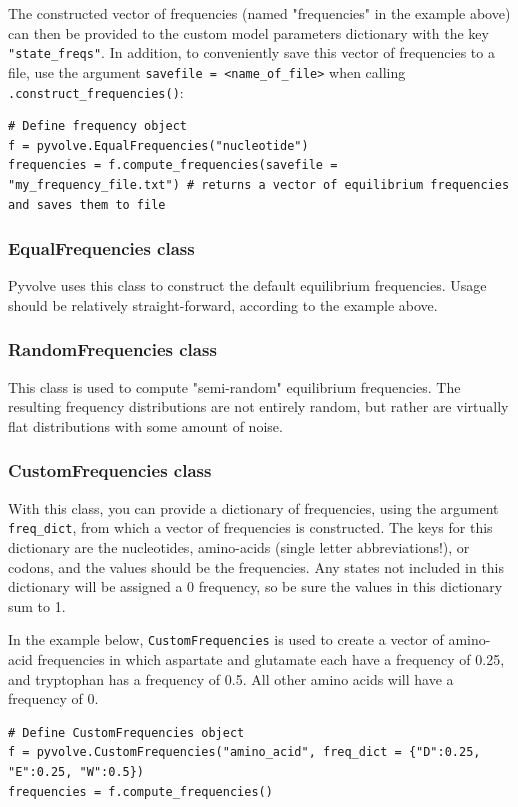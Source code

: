 \documentclass{article}
\newcommand{\code}[1]{\texttt{\small{#1}}}
\begin{document}
The constructed vector of frequencies (named "frequencies" in the example above) can then be provided to the custom model parameters dictionary with the key \code{"state\_freqs"}. In addition, to conveniently save this vector of frequencies to a file, use the argument \code{savefile = <name\_of\_file>} when calling \code{.construct\_frequencies()}:
\begin{lstlisting}
# Define frequency object
f = pyvolve.EqualFrequencies("nucleotide")
frequencies = f.compute_frequencies(savefile = "my_frequency_file.txt") # returns a vector of equilibrium frequencies and saves them to file
\end{lstlisting}


\subsubsection{EqualFrequencies class}
Pyvolve uses this class to construct the default equilibrium frequencies. Usage should be relatively straight-forward, according to the example above.

\subsubsection{RandomFrequencies class}
This class is used to compute "semi-random" equilibrium frequencies. The resulting frequency distributions are not entirely random, but rather are virtually flat distributions with some amount of noise.

\subsubsection{CustomFrequencies class}
With this class, you can provide a dictionary of frequencies, using the argument \code{freq\_dict}, from which a vector of frequencies is constructed. The keys for this dictionary are the nucleotides, amino-acids (single letter abbreviations!), or codons, and the values should be the frequencies. Any states not included in this dictionary will be assigned a 0 frequency, so be sure the values in this dictionary sum to 1.

In the example below, \code{CustomFrequencies} is used to create a vector of amino-acid frequencies in which aspartate and glutamate each have a frequency of 0.25, and tryptophan has a frequency of 0.5. All other amino acids will have a frequency of 0.
\begin{lstlisting}
# Define CustomFrequencies object
f = pyvolve.CustomFrequencies("amino_acid", freq_dict = {"D":0.25, "E":0.25, "W":0.5})
frequencies = f.compute_frequencies()
\end{lstlisting}
\end{document}
